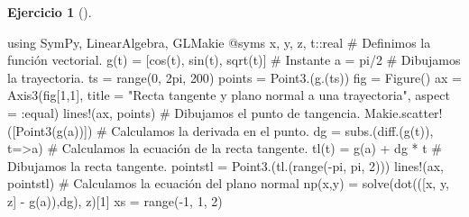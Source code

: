 \documentclass[
  a4paper,
]{scrreport}
\newenvironment{Shaded}{\begin{snugshade}}{\end{snugshade}}
\newcommand{\BuiltInTok}[1]{\textcolor[rgb]{0.00,0.23,0.31}{#1}}
\newcommand{\CommentTok}[1]{\textcolor[rgb]{0.37,0.37,0.37}{#1}}
\newcommand{\ConstantTok}[1]{\textcolor[rgb]{0.56,0.35,0.01}{#1}}
\newcommand{\DataTypeTok}[1]{\textcolor[rgb]{0.68,0.00,0.00}{#1}}
\newcommand{\FloatTok}[1]{\textcolor[rgb]{0.68,0.00,0.00}{#1}}
\newcommand{\FunctionTok}[1]{\textcolor[rgb]{0.28,0.35,0.67}{#1}}
\newcommand{\ImportTok}[1]{\textcolor[rgb]{0.00,0.46,0.62}{#1}}
\newcommand{\NormalTok}[1]{\textcolor[rgb]{0.00,0.23,0.31}{#1}}
\newcommand{\OperatorTok}[1]{\textcolor[rgb]{0.37,0.37,0.37}{#1}}
\newcommand{\PreprocessorTok}[1]{\textcolor[rgb]{0.68,0.00,0.00}{#1}}
\newcommand{\StringTok}[1]{\textcolor[rgb]{0.13,0.47,0.30}{#1}}
\theoremstyle{definition}
\newtheorem{exercise}{Ejercicio}[chapter]
\theoremstyle{remark}
\begin{document}
\begin{exercise}[]
\begin{enumerate}
\begin{tcolorbox}
\begin{Shaded}
\begin{Highlighting}[]
\ImportTok{using} \BuiltInTok{SymPy}\NormalTok{, }\BuiltInTok{LinearAlgebra}\NormalTok{, }\BuiltInTok{GLMakie}
\PreprocessorTok{@syms}\NormalTok{ x, y, z, t}\OperatorTok{::}\DataTypeTok{real}
\CommentTok{\# Definimos la función vectorial.}
\FunctionTok{g}\NormalTok{(t) }\OperatorTok{=}\NormalTok{ [}\FunctionTok{cos}\NormalTok{(t), }\FunctionTok{sin}\NormalTok{(t), }\FunctionTok{sqrt}\NormalTok{(t)]}
\CommentTok{\# Instante }
\NormalTok{a }\OperatorTok{=} \ConstantTok{pi}\OperatorTok{/}\FloatTok{2}
\CommentTok{\# Dibujamos la trayectoria.}
\NormalTok{ts }\OperatorTok{=} \FunctionTok{range}\NormalTok{(}\FloatTok{0}\NormalTok{, }\FloatTok{2}\NormalTok{pi, }\FloatTok{200}\NormalTok{)}
\NormalTok{points }\OperatorTok{=} \FunctionTok{Point3}\NormalTok{.(}\FunctionTok{g}\NormalTok{.(ts))}
\NormalTok{fig }\OperatorTok{=} \FunctionTok{Figure}\NormalTok{()}
\NormalTok{ax }\OperatorTok{=} \FunctionTok{Axis3}\NormalTok{(fig[}\FloatTok{1}\NormalTok{,}\FloatTok{1}\NormalTok{], title }\OperatorTok{=} \StringTok{"Recta tangente y plano normal a una trayectoria"}\NormalTok{, aspect }\OperatorTok{=} \OperatorTok{:}\NormalTok{equal)}
\FunctionTok{lines!}\NormalTok{(ax, points)}
\CommentTok{\# Dibujamos el punto de tangencia.}
\NormalTok{Makie.}\FunctionTok{scatter!}\NormalTok{([}\FunctionTok{Point3}\NormalTok{(}\FunctionTok{g}\NormalTok{(a))])}
\CommentTok{\# Calculamos la derivada en el punto.}
\NormalTok{dg }\OperatorTok{=} \FunctionTok{subs}\NormalTok{.(}\FunctionTok{diff}\NormalTok{.(}\FunctionTok{g}\NormalTok{(t)), t}\OperatorTok{=\textgreater{}}\NormalTok{a)}
\CommentTok{\# Calculamos la ecuación de la recta tangente.}
\FunctionTok{tl}\NormalTok{(t) }\OperatorTok{=} \FunctionTok{g}\NormalTok{(a) }\OperatorTok{+}\NormalTok{ dg }\OperatorTok{*}\NormalTok{ t}
\CommentTok{\# Dibujamos la recta tangente.}
\NormalTok{pointstl }\OperatorTok{=} \FunctionTok{Point3}\NormalTok{.(}\FunctionTok{tl}\NormalTok{.(}\FunctionTok{range}\NormalTok{(}\OperatorTok{{-}}\ConstantTok{pi}\NormalTok{, }\ConstantTok{pi}\NormalTok{, }\FloatTok{2}\NormalTok{)))}
\FunctionTok{lines!}\NormalTok{(ax, pointstl)}
\CommentTok{\# Calculamos la ecuación del plano normal}
\FunctionTok{np}\NormalTok{(x,y) }\OperatorTok{=} \FunctionTok{solve}\NormalTok{(}\FunctionTok{dot}\NormalTok{(([x, y, z] }\OperatorTok{{-}} \FunctionTok{g}\NormalTok{(a)),dg), z)[}\FloatTok{1}\NormalTok{]}
\NormalTok{xs }\OperatorTok{=} \FunctionTok{range}\NormalTok{(}\OperatorTok{{-}}\FloatTok{1}\NormalTok{, }\FloatTok{1}\NormalTok{, }\FloatTok{2}\NormalTok{)}

\end{Highlighting}
\end{Shaded}
\end{tcolorbox}
\end{enumerate}
\end{exercise}
\end{document}
